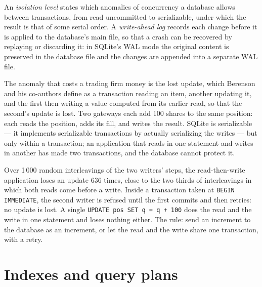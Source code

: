 \begin{definition}\label{def:pl:databases-and-sql:isolation}
An \emph{isolation level} states which anomalies of concurrency a database allows between transactions, from read
uncommitted to serializable, under which the result is that of some serial order. A \emph{write-ahead log} records each
change before it is applied to the database's main file, so that a crash can be recovered by replaying or discarding it: in SQLite's WAL mode
\textquotedbl{}the original content is preserved in the database file and the changes are appended into a separate WAL file\textquotedbl{}.
\end{definition}

The anomaly that costs a trading firm money is the lost update, which Berenson and his co-authors define as a transaction reading an item,
another updating it, and the first then writing a value computed from its earlier read, so that the second's update is lost. Two gateways
each add 100 shares to the same position: each reads the position, adds its fill, and writes the result. SQLite is serializable --- it
\textquotedbl{}implements serializable transactions by actually serializing the writes\textquotedbl{} --- but only within a transaction; an
application that reads in one statement and writes in another has made two transactions, and the database cannot protect it.

\label{lst:pl:databases-and-sql:lost}

Over 1\,000 random interleavings of the two writers' steps, the read-then-write application loses an update 636 times, close to the two
thirds of interleavings in which both reads come before a write. Inside a transaction taken at \texttt{BEGIN IMMEDIATE}, the second writer is
refused until the first commits and then retries: no update is lost. A single \texttt{UPDATE pos SET q = q + 100} does the read and the write
in one statement and loses nothing either. The rule: send an increment to the database as an increment, or let the read and the write
share one transaction, with a retry.

\section{Indexes and query plans}


